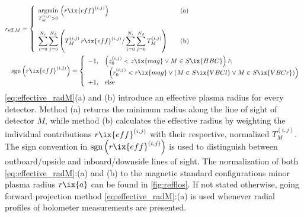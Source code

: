 %
                \begin{align}%
                    &r_{\text{eff}, M}=\left\{%
                    \begin{array}{ll}%
                        \underset{T^{\left(i,j\right)}_{M}>0}{\text{argmin}}\,\left(r\ix{eff}^{\left(i,j\right)}\right)&\quad\text{(a)}\\%
                        \,\\%
                        \displaystyle\sum_{i=0}^{N_{r}}\sum_{j=0}^{N_{\vartheta}}\left(T_{M}^{\left(i.j\right)}\,r\ix{eff}^{\left(i,j\right)}/\sum_{i=0}^{N_{r}}\sum_{j=0}^{N_{\vartheta}}T_{M}^{\left(i,j\right)}\right)&\quad\text{(b)}%
                    \end{array}\right.\label{eq:effective_radM}\\%
                    &\quad\text{sgn}\left(r\ix{eff}^{\left(i,j\right)}\right)=\left\{%
                    \begin{array}{ll}%
                        -1,&\left(z_{0}^{\left(i,j\right)}<z\ix{mag}\vee M\in S\ix{HBC}\right)\wedge\\%
                        &\,\,\,\,\left(r_{0}^{\left(i,j\right)}<r\ix{mag}\vee\left(M\in S\ix{VBCl}\vee M\in S\ix{VBCr}\right)\right)\\%
                        +1,&\text{else}%
                    \end{array}\right.\nonumber%
                \end{align}%
%
                \autoref{eq:effective_radM}(a) and (b) introduce an effective plasma radius for every detector. Method (a) returns the minimum radius along the line of sight of detector $M$, while method (b) calculates the effective radius by weighting the individual contributions $r\ix{eff}^{\left(i,j\right)}$ with their respective, normalized $T_{M}^{\left(i,j\right)}$. The sign convention in $\text{sgn}\left(r\ix{eff}^{\left(i,j\right)}\right)$ is used to distinguish between outboard/upside and inboard/downside lines of sight. The normalization of both \cref{eq:effective_radM}:(a) and (b) to the magnetic standard configurations minor plasma radius $r\ix{a}$ can be found in \cref{fig:refflos}. If not stated otherwise, going forward projection method \cref{eq:effective_radM}:(a) is used whenever radial profiles of bolometer measurements are presented.\\%
